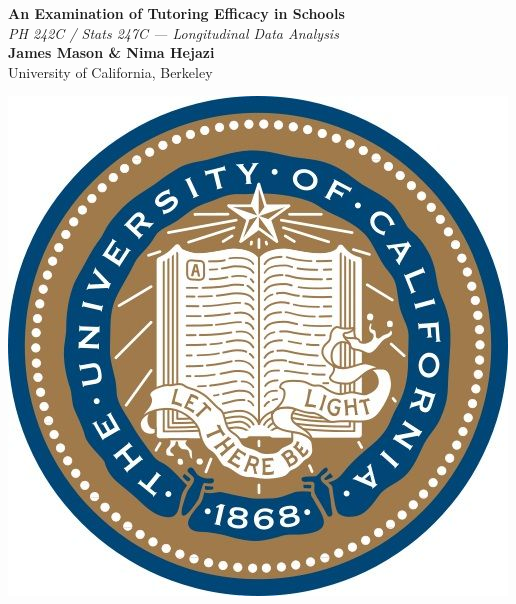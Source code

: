 \documentclass[a0,landscape]{a0poster}
\begin{document}


\begin{minipage}[b]{0.55\linewidth}
\veryHuge \color{NavyBlue} \textbf{An Examination of Tutoring Efficacy in Schools} \color{Black}\\ %
\Huge\textit{PH 242C / Stats 247C --- Longitudinal Data Analysis}\\[1cm] %
\huge \textbf{James Mason \& Nima Hejazi}\\ %
\huge University of California, Berkeley\\ %
\end{minipage}
%
\hfill
\includegraphics[scale=0.75]{logo_cal.jpg} %
\end{document}
